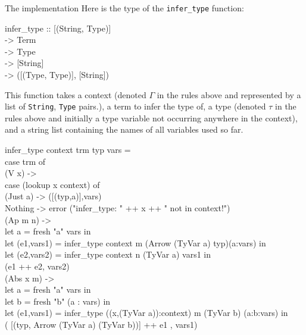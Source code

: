 \documentclass[11pt]{article}
\begin{document}
The implementation Here is the type of the {\tt{infer\_type}} function:
\begin{program*}
\> infer\_type :: [(String, Type)] \\ 
\>               -> Term \\ 
\>               -> Type \\ 
\>               -> [String] \\ 
\>               -> ([(Type, Type)], [String]) \\ 

\end{program*}
This function takes a context (denoted $\Gamma$ in the rules above and
represented by a list of {\tt{String}}, {\tt{Type}} pairs.), a term to infer
the type of, a type (denoted $\tau$ in the rules above and initially a type
variable not occurring anywhere in the context), and a string list containing
the names of all variables used so far.

\begin{program*}
\>  infer\_type context trm typ vars = \\ 
\>   case trm of \\ 
\>     (V x) ->  \\ 
\>        case (lookup x context) of  \\ 
\>          (Just a) -> ([(typ,a)],vars) \\ 
\>          Nothing ->  error ("infer\_type: " ++ x ++ " not in context!") \\ 
               
\>     (Ap m n) ->  \\ 
\>        let a = fresh "a" vars in \\ 
\>        let (e1,vars1) = infer\_type context m (Arrow (TyVar a) typ)(a:vars) in \\ 
\>        let (e2,vars2) = infer\_type context n (TyVar a) vars1 in \\ 
\>          (e1 ++ e2, vars2) \\ 

\>     (Abs x m) ->  \\ 
\>        let a = fresh "a" vars in \\ 
\>        let b = fresh "b" (a : vars) in \\ 
\>        let (e1,vars1) = infer\_type ((x,(TyVar a)):context) m (TyVar b) (a:b:vars) in \\ 
\>          ( [(typ, Arrow (TyVar a) (TyVar b))] ++ e1 , vars1) \\ 
\end{program*}
\end{document}
